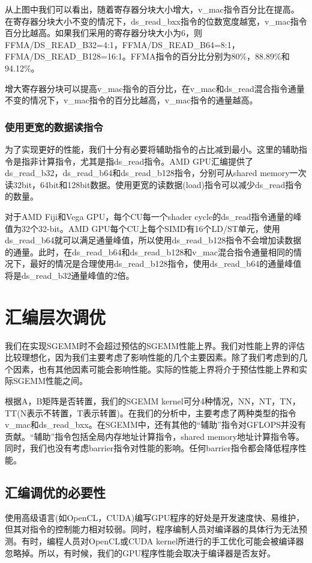 从上图中我们可以看出，随着寄存器分块大小增大，v\_mac指令百分比在提高。在寄存器分块大小不变的情况下，ds\_read\_bxx指令的位数宽度越宽，v\_mac指令百分比越高。如果我们采用的寄存器分块大小为6，则FFMA/DS\_READ\_B32=4:1，FFMA/DS\_READ\_B64=8:1，FFMA/DS\_READ\_B128=16:1。FFMA指令的百分比分别为80\%，88.89\%和94.12\%。

增大寄存器分块可以提高v\_mac指令的百分比，在v\_mac和ds\_read混合指令通量不变的情况下，v\_mac指令的百分比越高，v\_mac指令的通量越高。

\subsubsection{使用更宽的数据读指令}
为了实现更好的性能，我们十分有必要将辅助指令的占比减到最小。这里的辅助指令是指非计算指令，尤其是指ds\_read指令。AMD GPU汇编提供了ds\_read\_b32，ds\_read\_b64和ds\_read\_b128指令，分别可从shared memory一次读32bit，64bit和128bit数据。使用更宽的读数据(load)指令可以减少ds\_read指令的数量。

对于AMD Fiji和Vega GPU，每个CU每一个shader cycle的ds\_read指令通量的峰值为32个32-bit。AMD GPU每个CU上每个SIMD有16个LD/ST单元，使用ds\_read\_b64就可以满足通量峰值，所以使用ds\_read\_b128指令不会增加读数据的通量。此时，在ds\_read\_b64和ds\_read\_b128和v\_mac混合指令通量相同的情况下，最好的情况是合理使用ds\_read\_b128指令，使用ds\_read\_b64的通量峰值将是ds\_read\_b32通量峰值的2倍。


\section{汇编层次调优}
我们在实现SGEMM时不会超过预估的SGEMM性能上界。我们对性能上界的评估比较理想化，因为我们主要考虑了影响性能的几个主要因素。除了我们考虑到的几个因素，也有其他因素可能会影响性能。实际的性能上界将介于预估性能上界和实际SGEMM性能之间。

根据A，B矩阵是否转置，我们的SGEMM kernel可分4种情况，NN，NT，TN，TT(N表示不转置，T表示转置)。在我们的分析中，主要考虑了两种类型的指令v\_mac和ds\_read\_bxx。在SGEMM中，还有其他的“辅助”指令对GFLOPS并没有贡献。“辅助”指令包括全局内存地址计算指令，shared memory地址计算指令等。同时，我们也没有考虑barrier指令对性能的影响。任何barrier指令都会降低程序性能。

\subsection{汇编调优的必要性}
使用高级语言(如OpenCL，CUDA)编写GPU程序的好处是开发速度快、易维护，但其对指令的控制能力相对较弱。同时，程序编制人员对编译器的具体行为无法预测。有时，编程人员对OpenCL或CUDA kernel所进行的手工优化可能会被编译器忽略掉。所以，有时候，我们的GPU程序性能会取决于编译器是否友好。

